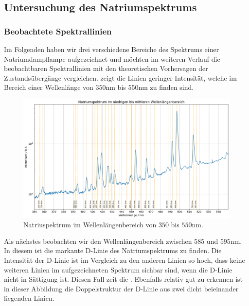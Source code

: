 \subsection{Untersuchung des Natriumspektrums}

\subsubsection*{Beobachtete Spektrallinien}

Im Folgenden haben wir drei verschiedene Bereiche des Spektrums einer Natriumdampflampe aufgezeichnet und möchten im weiteren Verlauf die beobachtbaren Spektrallinien mit den theoretischen Vorhersagen der Zustandsübergänge vergleichen.  zeigt die Linien geringer Intensität, welche im Bereich einer Wellenlänge von $350\si{\nano\meter}$ bis $550\si{\nano\meter}$ zu finden sind. 


\begin{figure}[H]
  \centering
  \includegraphics[width=.9\textwidth]{files/plots/na_spek_350_550.png}
  \caption{Natriuspektrum im Wellenlängenbereich von $350$ bis $550\si{\nano\meter}$.}
  \label{fig:na_spek_350_550}
\end{figure}

Als nächstes beobachten wir den Wellenlängenbereich zwischen $585$ und $595\si{\nano\meter}$. In diesem ist die markante D-Linie des Natriumspektrums zu finden. Die Intensität der D-Linie ist im Vergleich zu den anderen Linien so hoch, dass keine weiteren Linien im aufgezeichneten Spektrum sichbar sind, wenn die D-Linie nicht in Sättigung ist. Diesen Fall zeit die . Ebenfalls relativ gut zu erkennen ist in dieser Abbildung die Doppelstruktur der D-Linie aus zwei dicht beieinander liegenden Linien.



